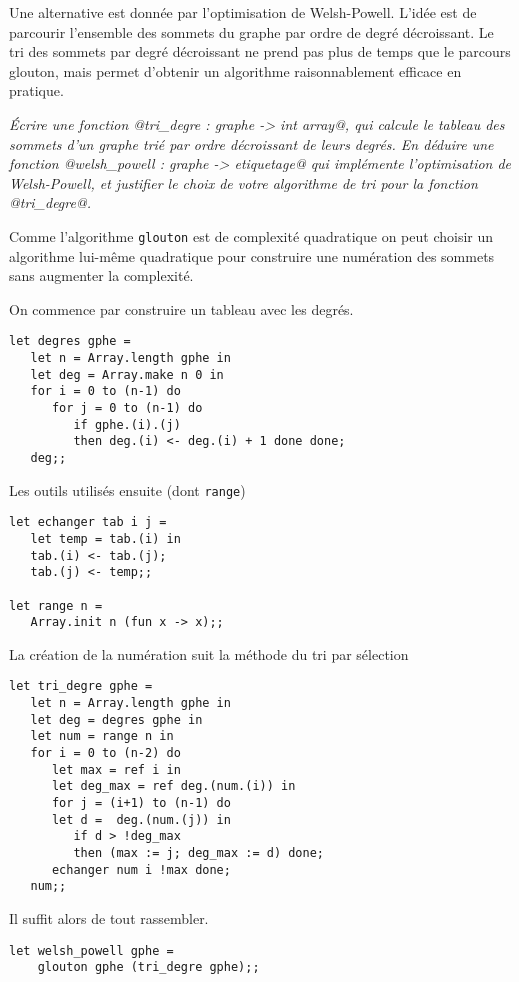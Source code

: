 Une alternative est donnée par l'optimisation de Welsh-Powell. L'idée est de parcourir l'ensemble des sommets du graphe par ordre de degré décroissant. Le tri des sommets par degré décroissant ne prend pas plus de temps que le parcours glouton, mais permet d'obtenir un algorithme raisonnablement efficace en pratique. 
\begin{Exercise} \it 
Écrire une fonction @tri_degre : graphe -> int array@, qui calcule le tableau des sommets d'un graphe trié par ordre décroissant de leurs degrés. En déduire une fonction @welsh_powell : graphe -> etiquetage@ qui implémente l'optimisation de Welsh-Powell, et justifier le choix de votre algorithme de tri pour la fonction @tri_degre@. 
\end{Exercise}  
\begin{Answer}
Comme l'algorithme \texttt{glouton} est de complexité quadratique on peut choisir un algorithme lui-même quadratique pour construire une numération des sommets sans augmenter la complexité.

On commence par construire un tableau avec les degrés.
\begin{lstlisting}
let degres gphe =
   let n = Array.length gphe in
   let deg = Array.make n 0 in
   for i = 0 to (n-1) do 
      for j = 0 to (n-1) do
         if gphe.(i).(j) 
         then deg.(i) <- deg.(i) + 1 done done;
   deg;;           
\end{lstlisting}

Les outils utilisés ensuite (dont \texttt{range})

\begin{lstlisting}
let echanger tab i j =
   let temp = tab.(i) in
   tab.(i) <- tab.(j);
   tab.(j) <- temp;;
    
let range n = 
   Array.init n (fun x -> x);;        
\end{lstlisting}

La création de la numération suit la méthode du tri par sélection
\begin{lstlisting}
let tri_degre gphe =
   let n = Array.length gphe in
   let deg = degres gphe in
   let num = range n in
   for i = 0 to (n-2) do
      let max = ref i in
      let deg_max = ref deg.(num.(i)) in
      for j = (i+1) to (n-1) do
      let d =  deg.(num.(j)) in
         if d > !deg_max
         then (max := j; deg_max := d) done;
      echanger num i !max done;
   num;;
\end{lstlisting}

Il suffit alors de tout rassembler.
\begin{lstlisting}
let welsh_powell gphe =
    glouton gphe (tri_degre gphe);;
\end{lstlisting}
\end{Answer}
